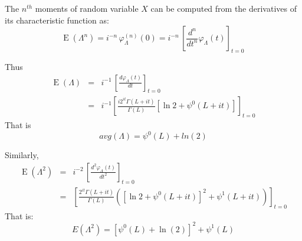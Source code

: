 The $n^{th}$ moments of random variable $X$ can be computed from the derivatives of its characteristic function as:
\begin{equation}
\operatorname{E}\left(\Lambda^n\right) = i^{-n}\, \varphi_\Lambda^{(n)}(0)
  = i^{-n}\, \left[\frac{d^n}{dt^n} \varphi_\Lambda(t)\right]_{t=0} \,\!
\end{equation}

Thus
\begin{eqnarray*}
 \operatorname{E}\left(\Lambda\right) &=& i^{-1}\, \left[\frac{d\varphi_\Lambda(t)}{dt} \right]_{t=0} \,\! \\
  &=& i^{-1} \left[ \frac{i 2^{it} \Gamma(L+it)}{\Gamma(L)} \left[ \ln{2} + \psi^0(L+it) \right] \right]_{t=0}
\end{eqnarray*}
That is
\begin{equation}
  avg(\Lambda) = \psi^0(L) + ln(2)
\end{equation}

Similarly,
\begin{eqnarray*}
 \operatorname{E}\left(\Lambda^2\right) &=& i^{-2}\, \left[\frac{d^2\varphi_\Lambda(t)}{dt^2} \right]_{t=0} \,\! \\
  &=& \left[ \frac{2^{it} \Gamma(L+it)}{\Gamma(L)} \left( \left[ \ln{2} + \psi^0(L+it) \right] ^ 2 + \psi^1(L+it) \right) \right]_{t=0}  
\end{eqnarray*}
That is:
\begin{equation}
  E(\Lambda^2) = \left[ \psi^0(L)+\ln(2) \right]^2 + \psi^1(L)
\end{equation}

